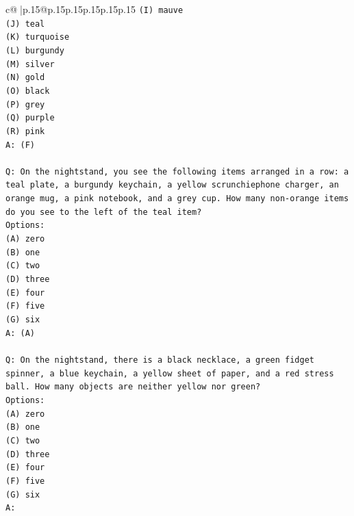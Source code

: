 \documentclass{article}
\begin{document}
{\begin{supertabular}{c@{$\;$}|p{.15\linewidth}@{}p{.15\linewidth}p{.15\linewidth}p{.15\linewidth}p{.15\linewidth}p{.15\linewidth}}
{{{\texttt{(I) mauve} \\
\texttt{(J) teal} \\
\texttt{(K) turquoise} \\
\texttt{(L) burgundy} \\
\texttt{(M) silver} \\
\texttt{(N) gold} \\
\texttt{(O) black} \\
\texttt{(P) grey} \\
\texttt{(Q) purple} \\
\texttt{(R) pink} \\
\texttt{A: (F)} \\
\\ 
\texttt{Q: On the nightstand, you see the following items arranged in a row: a teal plate, a burgundy keychain, a yellow scrunchiephone charger, an orange mug, a pink notebook, and a grey cup. How many non{-}orange items do you see to the left of the teal item?} \\
\texttt{Options:} \\
\texttt{(A) zero} \\
\texttt{(B) one} \\
\texttt{(C) two} \\
\texttt{(D) three} \\
\texttt{(E) four} \\
\texttt{(F) five} \\
\texttt{(G) six} \\
\texttt{A: (A)} \\
\\ 
\texttt{Q: On the nightstand, there is a black necklace, a green fidget spinner, a blue keychain, a yellow sheet of paper, and a red stress ball. How many objects are neither yellow nor green?} \\
\texttt{Options:} \\
\texttt{(A) zero} \\
\texttt{(B) one} \\
\texttt{(C) two} \\
\texttt{(D) three} \\
\texttt{(E) four} \\
\texttt{(F) five} \\
\texttt{(G) six} \\
\texttt{A:} \\
            }
        }
    }
     \\ \\


\end{supertabular}}
\end{document}
